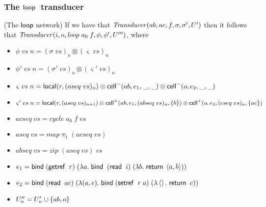 \subsubsection{The $\mathsf{loop}\;$ transducer}
\begin{lemma}{(The $\mathsf{loop}$ network)}
If we have that $\mathit{Transducer}(ab, ac, f, \sigma, \sigma', U')$ 
then it follows that $\mathit{Transducer}(i, o, \mathit{loop}\;a_0\;f, \phi, \phi', U''')$, where 

\begin{itemize}
\item $\phi\;vs\;n = (\sigma\;vs)_n \otimes (\varsigma\;vs)_n $
\item $\phi'\;vs\;n = (\sigma'\;vs)_n \otimes (\varsigma'\;vs)_n$
\item $\varsigma\;vs\;n = \mathsf{local}({r}, {(aseq\;vs)_n}) \otimes \mathsf{cell}^{-}({ab}, {e_1}, {\_}, {\_}) \otimes \mathsf{cell}^{-}({o}, {e_2}, {\_}, {\_})$ 
\item $\varsigma'\;vs\;n = {\small \mathsf{local}({r}, {(aseq\;vs)_{n+1}}) \otimes \mathsf{cell}^{+}({ab}, {e_1}, {(abseq\;vs)_n}, {\{{b}\}}) \otimes \mathsf{cell}^{+}({o}, {e_2}, {(cseq\;vs)_n}, {\{{ac}\}})}$ 
\item $acseq\;vs = \mathit{cycle}\;a_0\;f\;vs$
\item $aseq\;vs = \mathit{map}\;\pi_1\;(acseq\;vs)$
\item $abseq\;vs = \mathit{zip}\;(aseq\;vs)\;vs$
\item $e_1 = \mathsf{bind}\; (\mathsf{getref}\;\;r)\;(\lambda a.\;\mathsf{bind}\;\;(\mathsf{read}\;\;i)\; (\lambda b.\;\mathsf{return}\;\left<{a},{b}\right>))$
\item $e_2 = \mathsf{bind}\; (\mathsf{read}\;\;ac)\;(\lambda (a,c).\;\mathsf{bind}\; (\mathsf{setref}\;\;r\;a)\; (\lambda \left<\right>.\;\mathsf{return}\;\;c))$
\item $U''_n = U'_n \cup \{{ab,o}\}$
\end{itemize}
\end{lemma}

